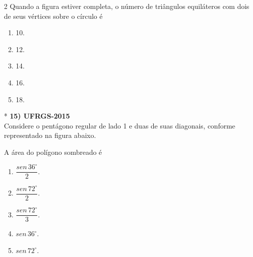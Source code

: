 \documentclass[11pt,a4paper]{article}
\begin{document}
\begin{paracol}{2}
    Quando a figura estiver completa, o número de triângulos equiláteros com dois de seus vértices sobre o círculo é

    \begin{enumerate}[label=(\Alph*), itemsep=0.2cm]
        \item 10.
        \item 12.
        \item 14.
        \item 16.
        \item 18.
    \end{enumerate}
    \vspace{0.4cm}

    \switchcolumn[1]
    \vspace{8cm}

    \switchcolumn[0]*
    \textbf{15) UFRGS-2015} \\
    Considere o pentágono regular de lado 1 e duas de suas diagonais, conforme representado na figura abaixo.

    \vspace{0.3cm}
    \begin{center}
    \end{center}
    \vspace{0.3cm}

    A área do polígono sombreado é

    \begin{enumerate}[label=(\Alph*), itemsep=0.2cm]
        \item $\dfrac{sen\, 36^\circ}{2}$.
        \item $\dfrac{sen\, 72^\circ}{2}$.
        \item $\dfrac{sen\, 72^\circ}{3}$.
        \item $sen\, 36^\circ$.
        \item $sen\, 72^\circ$.
    \end{enumerate}
    \vspace{0.4cm}


\end{paracol}
\end{document}
